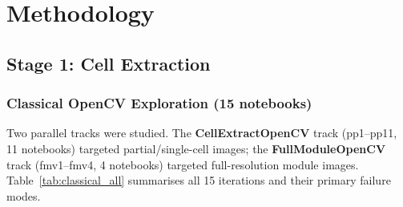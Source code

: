 \documentclass[conference]{IEEEtran}
\begin{document}
\section{Methodology}
\label{sec:method}

\subsection{Stage 1: Cell Extraction}
\label{sec:stage1}

\subsubsection{Classical OpenCV Exploration (15 notebooks)}

Two parallel tracks were studied. The \textbf{CellExtractOpenCV} track (pp1--pp11, 11 notebooks) targeted partial/single-cell images; the \textbf{FullModuleOpenCV} track (fmv1--fmv4, 4 notebooks) targeted full-resolution module images. Table~\ref{tab:classical_all} summarises all 15 iterations and their primary failure modes.
\end{document}
